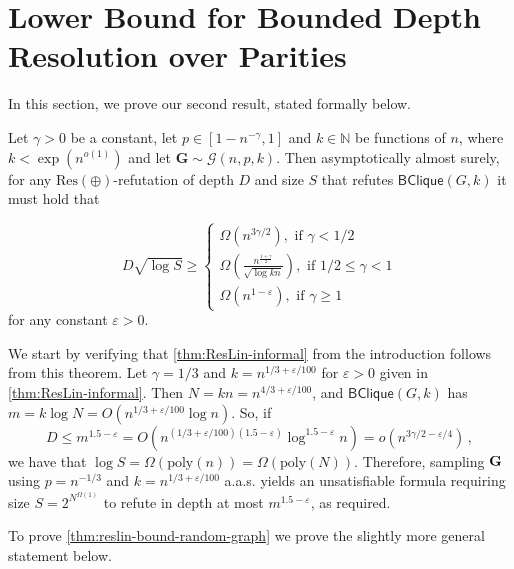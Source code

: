\documentclass[10pt,a4paper]{article}
\makeatletter
\theoremstyle{definition}
\theoremstyle{remark}
\theoremstyle{example}
\theoremstyle{plain}
\newcommand{\calG}{\mathcal{G}}
\newcommand{\Gbf}{\bm{G}}
\newcommand{\ResLin}{\textrm{Res}(\oplus)}
\newcommand{\binClique}[2]{\mathsf{BClique}({#1}, {#2})}
\newcommand{\binCliqueGk}{\binClique{G}{k}}
\newcommand{\aas}{a.a.s.\@\xspace}
\makeatother
\begin{document}
\section{Lower Bound for Bounded Depth Resolution over Parities}
\label{sec:binCliqueResLin}


In this section, we prove our second result, stated formally below.




\begin{theorem}
    \label{thm:reslin-bound-random-graph}
    Let $\gamma>0$ be a constant, let $p\in [1-n^{-\gamma},1]$ and $k \in\mathbb{N}$  be functions of $n$, where $k < \exp(n^{o(1)})$ and let $\Gbf\sim \calG(n,p,k)$. Then asymptotically almost surely, for any $\ResLin$-refutation of depth $D$ and size $S$ that refutes $\binCliqueGk$ it must hold that
    
    \begin{equation*}
    D\sqrt{\log S}\geq
        \begin{cases}
            \Omega(n^{3\gamma/2}), \text{ if } \gamma < 1/2\\
            \Omega(\frac{n^{\frac{1+\gamma}{2}}}{\sqrt{\log kn}}), \text{ if } 1/2\leq \gamma < 1\\
            \Omega(n^{1-\varepsilon}), \text{ if } \gamma \ge 1 
        \end{cases}
    \end{equation*}
    for any constant $\varepsilon > 0$.
\end{theorem}

We start by verifying that \autoref{thm:ResLin-informal} from the introduction follows from this theorem. Let $\gamma= 1/3$ and $k=n^{1/3+\varepsilon/100}$ for $\varepsilon>0$ given in \autoref{thm:ResLin-informal}.
    Then $N=kn=n^{4/3+\varepsilon/100}$, and $\binCliqueGk$ has $m= k\log N = 
    O(n^{1/3+\varepsilon/100}\log n)$. 
    So, if 
    \begin{equation*}
    D\leq m^{1.5-\varepsilon}=O(n^{(1/3+\varepsilon/100)(1.5-\varepsilon)}\log^{1.5-\varepsilon} n)=o(n^{3\gamma/2-\varepsilon/4})\,,
    \end{equation*}
    we have that $\log S= \Omega(\textrm{poly}(n))=\Omega(\textrm{poly}(N))$. Therefore, sampling $\bf G$ using $p=n^{-1/3}$ and $k=n^{1/3+\varepsilon/100}$  \aas yields an unsatisfiable formula requiring size $S= 2^{N^{\Omega(1)}}$ to refute in depth at most $m^{1.5-\varepsilon}$, as required.

To prove \autoref{thm:reslin-bound-random-graph} we prove the slightly more general statement below. 
 
\end{document}
